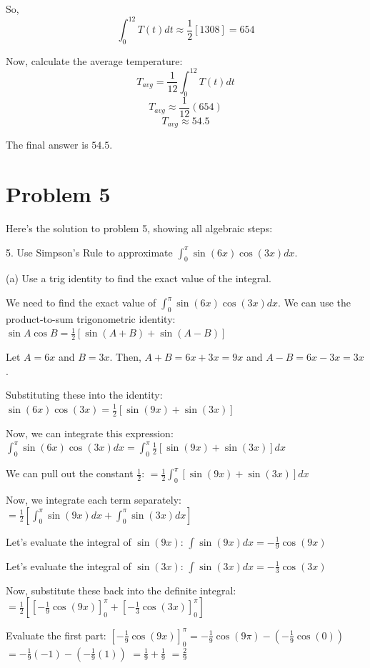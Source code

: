 \documentclass{article}
\begin{document}
So,
$$ \int_0^{12} T(t) dt \approx \frac{1}{2} [1308] = 654 $$

Now, calculate the average temperature:
$$ T_{avg} = \frac{1}{12} \int_0^{12} T(t) dt $$
$$ T_{avg} \approx \frac{1}{12} (654) $$
$$ T_{avg} \approx 54.5 $$

The final answer is $\boxed{54.5}$.

\newpage

\section*{Problem 5}
Here's the solution to problem 5, showing all algebraic steps:

5. Use Simpson's Rule to approximate $\int_0^\pi \sin(6x) \cos(3x) dx$.

(a) Use a trig identity to find the exact value of the integral.

We need to find the exact value of $\int_0^\pi \sin(6x) \cos(3x) dx$.
We can use the product-to-sum trigonometric identity:
$\sin A \cos B = \frac{1}{2}[\sin(A+B) + \sin(A-B)]$

Let $A = 6x$ and $B = 3x$.
Then, $A+B = 6x + 3x = 9x$ and $A-B = 6x - 3x = 3x$.

Substituting these into the identity:
$\sin(6x) \cos(3x) = \frac{1}{2}[\sin(9x) + \sin(3x)]$

Now, we can integrate this expression:
$\int_0^\pi \sin(6x) \cos(3x) dx = \int_0^\pi \frac{1}{2}[\sin(9x) + \sin(3x)] dx$

We can pull out the constant $\frac{1}{2}$:
$= \frac{1}{2} \int_0^\pi [\sin(9x) + \sin(3x)] dx$

Now, we integrate each term separately:
$= \frac{1}{2} \left[ \int_0^\pi \sin(9x) dx + \int_0^\pi \sin(3x) dx \right]$

Let's evaluate the integral of $\sin(9x)$:
$\int \sin(9x) dx = -\frac{1}{9} \cos(9x)$

Let's evaluate the integral of $\sin(3x)$:
$\int \sin(3x) dx = -\frac{1}{3} \cos(3x)$

Now, substitute these back into the definite integral:
$= \frac{1}{2} \left[ \left[-\frac{1}{9} \cos(9x)\right]_0^\pi + \left[-\frac{1}{3} \cos(3x)\right]_0^\pi \right]$

Evaluate the first part:
$\left[-\frac{1}{9} \cos(9x)\right]_0^\pi = -\frac{1}{9} \cos(9\pi) - \left(-\frac{1}{9} \cos(0)\right)$
$= -\frac{1}{9}(-1) - \left(-\frac{1}{9}(1)\right)$
$= \frac{1}{9} + \frac{1}{9}$
$= \frac{2}{9}$
\end{document}
